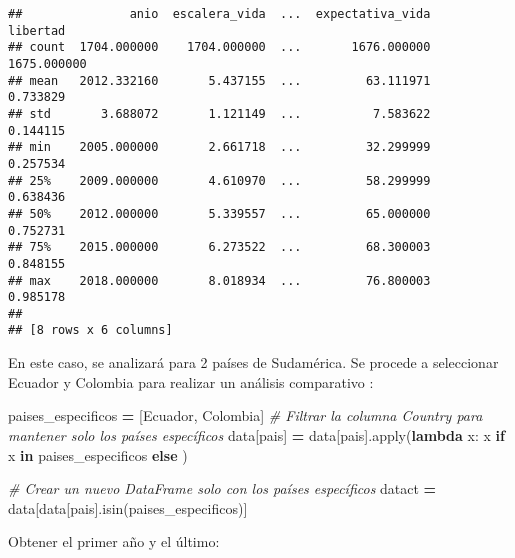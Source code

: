\documentclass[
]{article}
\newenvironment{Shaded}{\begin{snugshade}}{\end{snugshade}}
\newcommand{\BuiltInTok}[1]{#1}
\newcommand{\CommentTok}[1]{\textcolor[rgb]{0.56,0.35,0.01}{\textit{#1}}}
\newcommand{\ControlFlowTok}[1]{\textcolor[rgb]{0.13,0.29,0.53}{\textbf{#1}}}
\newcommand{\KeywordTok}[1]{\textcolor[rgb]{0.13,0.29,0.53}{\textbf{#1}}}
\newcommand{\NormalTok}[1]{#1}
\newcommand{\OperatorTok}[1]{\textcolor[rgb]{0.81,0.36,0.00}{\textbf{#1}}}
\newcommand{\StringTok}[1]{\textcolor[rgb]{0.31,0.60,0.02}{#1}}
\begin{document}
\begin{verbatim}
##               anio  escalera_vida  ...  expectativa_vida     libertad
## count  1704.000000    1704.000000  ...       1676.000000  1675.000000
## mean   2012.332160       5.437155  ...         63.111971     0.733829
## std       3.688072       1.121149  ...          7.583622     0.144115
## min    2005.000000       2.661718  ...         32.299999     0.257534
## 25%    2009.000000       4.610970  ...         58.299999     0.638436
## 50%    2012.000000       5.339557  ...         65.000000     0.752731
## 75%    2015.000000       6.273522  ...         68.300003     0.848155
## max    2018.000000       8.018934  ...         76.800003     0.985178
## 
## [8 rows x 6 columns]
\end{verbatim}

En este caso, se analizará para 2 países de Sudamérica. Se procede a
seleccionar Ecuador y Colombia para realizar un análisis comparativo :

\begin{Shaded}
\begin{Highlighting}[]

\NormalTok{paises\_especificos }\OperatorTok{=}\NormalTok{ [}\StringTok{\textquotesingle{}Ecuador\textquotesingle{}}\NormalTok{, }\StringTok{\textquotesingle{}Colombia\textquotesingle{}}\NormalTok{]}
\CommentTok{\# Filtrar la columna \textquotesingle{}Country\textquotesingle{} para mantener solo los países específicos}
\NormalTok{data[}\StringTok{\textquotesingle{}pais\textquotesingle{}}\NormalTok{] }\OperatorTok{=}\NormalTok{ data[}\StringTok{\textquotesingle{}pais\textquotesingle{}}\NormalTok{].}\BuiltInTok{apply}\NormalTok{(}\KeywordTok{lambda}\NormalTok{ x: x }\ControlFlowTok{if}\NormalTok{ x }\KeywordTok{in}\NormalTok{ paises\_especificos }\ControlFlowTok{else} \StringTok{\textquotesingle{}\textquotesingle{}}\NormalTok{)}

\CommentTok{\# Crear un nuevo DataFrame solo con los países específicos}
\NormalTok{datact }\OperatorTok{=}\NormalTok{ data[data[}\StringTok{\textquotesingle{}pais\textquotesingle{}}\NormalTok{].isin(paises\_especificos)]}
\end{Highlighting}
\end{Shaded}

Obtener el primer año y el último:
\end{document}
